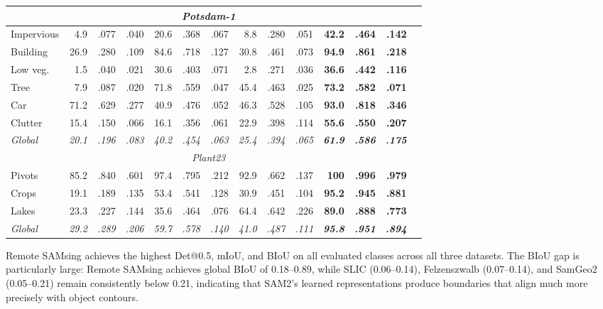 \documentclass[review,11pt,authoryear]{elsarticle}
\begin{document}
\begin{table}[htbp]
\begin{tabular}{lrrrrrrrrrrrrr}
\midrule
\multicolumn{13}{c}{\footnotesize\textit{Potsdam-1}} \\
\midrule
Impervious&  4.9 & .077 & .040 & 20.6 & .368 & .067 &  8.8 & .280 & .051 & \textbf{42.2} & \textbf{.464} & \textbf{.142} \\
Building  & 26.9 & .280 & .109 & 84.6 & .718 & .127 & 30.8 & .461 & .073 & \textbf{94.9} & \textbf{.861} & \textbf{.218} \\
Low veg.  &  1.5 & .040 & .021 & 30.6 & .403 & .071 &  2.8 & .271 & .036 & \textbf{36.6} & \textbf{.442} & \textbf{.116} \\
Tree      &  7.9 & .087 & .020 & 71.8 & .559 & .047 & 45.4 & .463 & .025 & \textbf{73.2} & \textbf{.582} & \textbf{.071} \\
Car       & 71.2 & .629 & .277 & 40.9 & .476 & .052 & 46.3 & .528 & .105 & \textbf{93.0} & \textbf{.818} & \textbf{.346} \\
Clutter   & 15.4 & .150 & .066 & 16.1 & .356 & .061 & 22.9 & .398 & .114 & \textbf{55.6} & \textbf{.550} & \textbf{.207} \\
\textit{Global} & \textit{20.1} & \textit{.196} & \textit{.083} & \textit{40.2} & \textit{.454} & \textit{.063} & \textit{25.4} & \textit{.394} & \textit{.065} & \textit{\textbf{61.9}} & \textit{\textbf{.586}} & \textit{\textbf{.175}} \\
\midrule
\multicolumn{13}{c}{\footnotesize\textit{Plant23}} \\
\midrule
Pivots    & 85.2 & .840 & .601 & 97.4 & .795 & .212 & 92.9 & .662 & .137 & \textbf{100} & \textbf{.996} & \textbf{.979} \\
Crops     & 19.1 & .189 & .135 & 53.4 & .541 & .128 & 30.9 & .451 & .104 & \textbf{95.2} & \textbf{.945} & \textbf{.881} \\
Lakes     & 23.3 & .227 & .144 & 35.6 & .464 & .076 & 64.4 & .642 & .226 & \textbf{89.0} & \textbf{.888} & \textbf{.773} \\
\textit{Global} & \textit{29.2} & \textit{.289} & \textit{.206} & \textit{59.7} & \textit{.578} & \textit{.140} & \textit{41.0} & \textit{.487} & \textit{.111} & \textit{\textbf{95.8}} & \textit{\textbf{.951}} & \textit{\textbf{.894}} \\
\bottomrule
\end{tabular}
\end{table}

Remote SAMsing achieves the highest Det@0.5, mIoU, and BIoU on all evaluated classes across all three datasets. The BIoU gap is particularly large: Remote SAMsing achieves global BIoU of 0.18--0.89, while SLIC (0.06--0.14), Felzenszwalb (0.07--0.14), and SamGeo2 (0.05--0.21) remain consistently below 0.21, indicating that SAM2's learned representations produce boundaries that align much more precisely with object contours.
\end{document}
